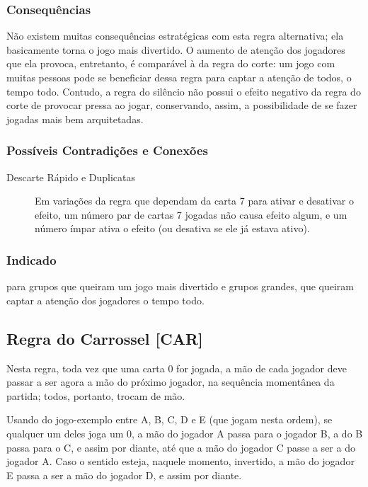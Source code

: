 \subsubsection{Consequências}

Não existem muitas consequências estratégicas com esta regra alternativa; ela basicamente torna o jogo mais divertido. O aumento de atenção dos jogadores que ela provoca, entretanto, é comparável à da regra do corte: um jogo com muitas pessoas pode se beneficiar dessa regra para captar a atenção de todos, o tempo todo. Contudo, a regra do silêncio não possui o efeito negativo da regra do corte de provocar pressa ao jogar, conservando, assim, a possibilidade de se fazer jogadas mais bem arquitetadas.

\subsubsection{Possíveis Contradições e Conexões}

\begin{description}
\item[Descarte Rápido e Duplicatas]{Em variações da regra que dependam da carta 7 para ativar e desativar o efeito, um número par de cartas 7 jogadas não causa efeito algum, e um número ímpar ativa o efeito (ou desativa se ele já estava ativo).}
\end{description}

\subsubsection{Indicado}

para grupos que queiram um jogo mais divertido e grupos grandes, que queiram captar a atenção dos jogadores o tempo todo.

\subsection{Regra do Carrossel [CAR]}

Nesta regra, toda vez que uma carta 0 for jogada, a mão de cada jogador deve passar a ser agora a mão do próximo jogador, na sequência momentânea da partida; todos, portanto, trocam de mão.

Usando do jogo-exemplo entre A, B, C, D e E (que jogam nesta ordem), se qualquer um deles joga um 0, a mão do jogador A passa para o jogador B, a do B passa para o C, e assim por diante, até que a mão do jogador C passe a ser a do jogador A. Caso o sentido esteja, naquele momento, invertido, a mão do jogador E passa a ser a mão do jogador D, e assim por diante.

